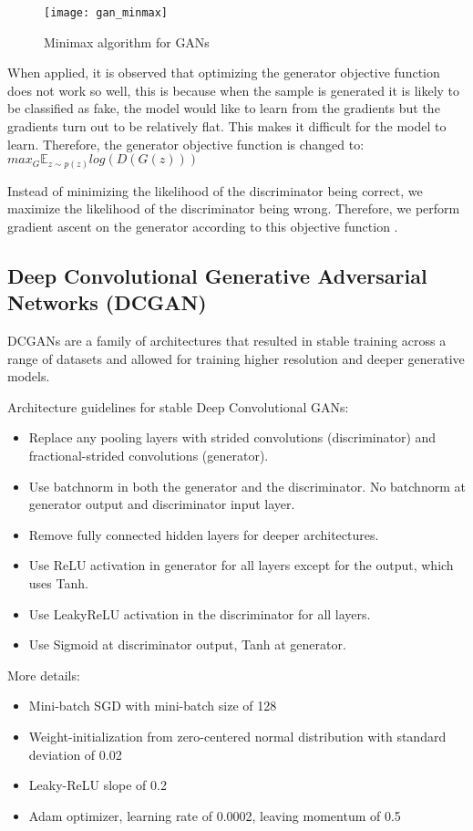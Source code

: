 \begin{figure}
	\centering
		\texttt{[image: gan\_minmax]}
	\caption{Minimax algorithm for GANs \cite{goodfellow2014generative}}
	\label{fig:gan_minmax}
\end{figure}

When applied, it is observed that optimizing the generator objective function does not work so well, this is because when the sample is generated it is likely to be classified as fake, the model would like to learn from the gradients but the gradients turn out to be relatively flat. This makes it difficult for the model to learn. Therefore, the generator objective function is changed to: $max_{G} \mathbb{E}_{z \sim{}p(z)} log(D(G(z)))$

Instead of minimizing the likelihood of the discriminator being correct, we maximize the likelihood of the discriminator being wrong. Therefore, we perform gradient ascent on the generator according to this objective function \cite{gansexpl-tds}.

\subsection{Deep Convolutional Generative Adversarial Networks (DCGAN)}
DCGANs are a family of architectures that resulted in stable training across a range of datasets and allowed for training higher
resolution and deeper generative models.

Architecture guidelines for stable Deep Convolutional GANs:
\begin{itemize}
	\item Replace any pooling layers with strided convolutions (discriminator) and fractional-strided convolutions (generator).
	\item Use batchnorm in both the generator and the discriminator. No batchnorm at generator output and discriminator input layer.
	\item Remove fully connected hidden layers for deeper architectures.
	\item Use ReLU activation in generator for all layers except for the output, which uses Tanh.
	\item Use LeakyReLU activation in the discriminator for all layers.
	\item Use Sigmoid at discriminator output, Tanh at generator.
\end{itemize}

More details:
\begin{itemize}
	\item
		Mini-batch SGD with mini-batch size of 128
	\item
		Weight-initialization from zero-centered normal distribution with standard deviation of 0.02
	\item
		Leaky-ReLU slope of 0.2
	\item
		Adam optimizer, learning rate of 0.0002, leaving momentum of 0.5
\end{itemize}

